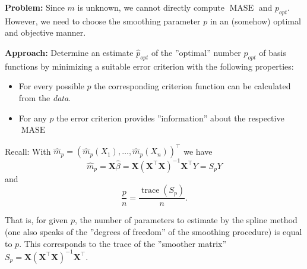 \documentclass[14pt]{extreport}\usepackage[]{graphicx}\usepackage[]{xcolor}
\begin{document}
{\bf Problem:} Since $m$ is unknown, we cannot directly compute $\operatorname{MASE}$ and $p_{opt}$. However, we need to choose the smoothing parameter $p$ in an (somehow) optimal and objective manner.

\newpage

{\bf Approach:} Determine an estimate $\hat p_{opt}$ of the ''optimal'' number $p_{opt}$ of basis functions
by minimizing a suitable error criterion with the following properties:
\begin{itemize}
\item For every possible $p$ the corresponding criterion function can be calculated from the {\em data}.
\item For any $p$ the error criterion provides ''information'' about the respective  $\operatorname{MASE}$
\end{itemize}

\bigskip

Recall: With $\hat m_p=(\hat m_p(X_1),\dots,\hat m_p(X_n))^\top $ we have
$$
\hat m_p=\mathbf{X}\hat\beta=\mathbf{X}(\mathbf{X}^\top \mathbf{X})^{-1}\mathbf{X}^\top Y=S_pY
$$
and 
$$
\frac{p}{n}=\frac{\operatorname{trace}(S_p)}{n}.
$$ 

\bigskip


That is, for given $p$, the number of parameters to estimate by
the spline method (one also speaks of the ''degrees of freedom'' of the smoothing procedure) is equal to $p$.
This corresponds to the trace of the ''smoother matrix'' $S_p=\mathbf{X}(\mathbf{X}^\top \mathbf{X})^{-1}\mathbf{X}^\top $.

\bigbreak
\end{document}
